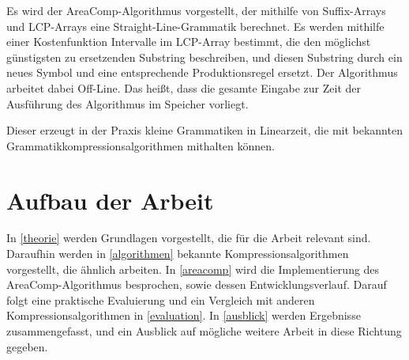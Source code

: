Es wird der AreaComp-Algorithmus vorgestellt, der mithilfe von Suffix-Arrays und LCP-Arrays \cite{manber_suffix_1993} eine Straight-Line-Grammatik berechnet. Es werden mithilfe einer Kostenfunktion Intervalle im LCP-Array bestimmt, die den möglichst günstigsten zu ersetzenden Substring beschreiben, und diesen Substring durch ein neues Symbol und eine entsprechende Produktionsregel ersetzt.
Der Algorithmus arbeitet dabei Off-Line. Das heißt, dass die gesamte Eingabe zur Zeit der Ausführung des Algorithmus im Speicher vorliegt.

Dieser erzeugt in der Praxis kleine Grammatiken in Linearzeit, die mit bekannten Grammatikkompressionsalgorithmen mithalten können.  

\section{Aufbau der Arbeit}

In \autoref{theorie} werden Grundlagen vorgestellt, die für die Arbeit relevant sind. Daraufhin werden in \autoref{algorithmen} bekannte Kompressionsalgorithmen vorgestellt, die ähnlich arbeiten. In \autoref{areacomp} wird die Implementierung des AreaComp-Algorithmus besprochen, sowie dessen Entwicklungsverlauf. Darauf folgt eine praktische Evaluierung und ein Vergleich mit anderen Kompressionsalgorithmen in \autoref{evaluation}. In \autoref{ausblick} werden Ergebnisse zusammengefasst, und ein Ausblick auf mögliche weitere Arbeit in diese Richtung gegeben.